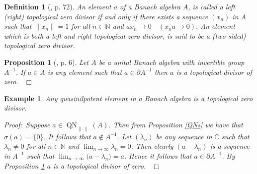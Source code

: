 \documentclass[12pt, oneside]{book}
\newtheorem{proposition}[theorem]{Proposition}
\newtheorem{example}[theorem]{Example}
\newtheorem{definition}[theorem]{Definition}
\newcommand{\proof}{{\noindent \it Proof:~}}
\newcommand{\qed}{\hfill ~$\Box$\\}
\def\QN{\operatorname{QN}}
\begin{document}
\begin{definition}[\cite{G2}, p. 72]  
\normalfont
\noindent An element $a$ of a Banach algebra $A$, is called a {\sl left (right) topological zero divisor} if and only if there exists a sequence $(x_n)$ in $A$ such that $\|x_n\|=1$ for all $n \in \mathbb{N}$ and $a x_n \rightarrow 0 \quad (x_na \rightarrow 0)$. An element which is both a left and right topological zero divisor, is said to be a {\sl (two-sided) topological zero divisor}.

\end{definition}

\begin{proposition} [\cite{Muller}, p. 6] \label{boundaryOfInv}
\normalfont
\noindent Let $A$ be a unital Banach algebra with invertible group $A^{-1}$.
If $a \in A$ is any element such that $a \in \partial A^{-1}$ then $a$ is a topological divisor of zero.
\qed
\end{proposition}

\begin{example} 
\normalfont
\noindent Any quasinilpotent element in a Banach algebra is a topological zero divisor.
\vskip 0.3cm

\proof \space Suppose $a \in \QN_{\| \cdot \|}(A)$. Then from Proposition \ref{QNs} we have that 
$\sigma(a)=\{0\}$. It follows that $a \not \in A^{-1}$. Let $(\lambda_n)$ be any sequence in 
$\mathbb{C}$ such that $\lambda_n \neq 0$ for all $n \in \mathbb{N}$ and 
$\displaystyle{\lim_{n \to \infty}} \lambda_n=0$. Then clearly $(a - \lambda_n)$ is a sequence in $A^{-1}$ 
such that $\displaystyle{  \lim_{n \to \infty} (a - \lambda_n})=a$. 
Hence it follows that $a \in \partial A^{-1}$. By Proposition \ref{boundaryOfInv} $a$ is a topological divisor of zero.
\qed

\end{example}
\end{document}
